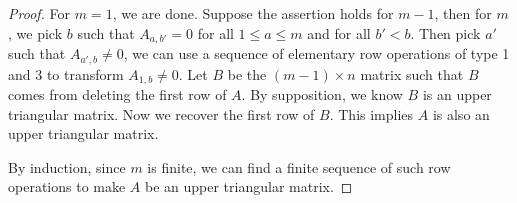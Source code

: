 \begin{Exercise}
	\begin{proof}
		For $m=1$, we are done. Suppose the assertion holds for $m-1$, then for $m$, we pick $b$ such that $A_{a,b'} = 0$ for all $1\leq a \leq m$ and for all $b'<b$. Then pick $a'$ such that $A_{a',b}\neq 0$, we can use a sequence of elementary row operations of type 1 and 3 to transform $A_{1, b}\neq 0$. Let $B$ be the $(m-1)\times n$ matrix such that $B$ comes from deleting the first row of $A$. By supposition, we know $B$ is an upper triangular matrix. Now we recover the first row of $B$. This implies $A$ is also an upper triangular matrix.
		
		By induction, since $m$ is finite, we can find a finite sequence of such row operations to make $A$ be an upper triangular matrix.
	\end{proof}
\end{Exercise}